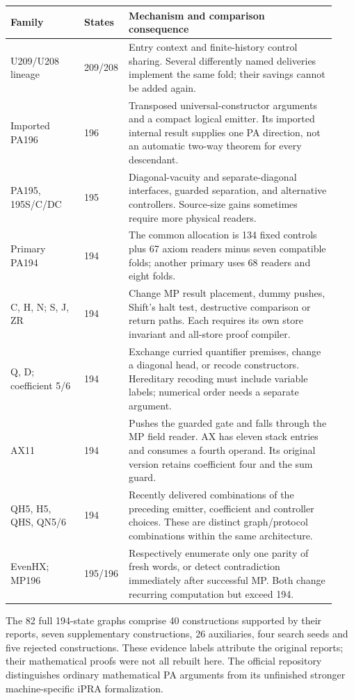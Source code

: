 \begin{longtable}{@{}p{0.22\linewidth}p{0.09\linewidth}p{0.62\linewidth}@{}}
\toprule Family & States & Mechanism and comparison consequence\\\midrule\endhead
U209/U208 lineage &209/208& Entry context and finite-history control sharing. Several differently named deliveries implement the same fold; their savings cannot be added again.\\[4pt]
Imported PA196 &196& Transposed universal-constructor arguments and a compact logical emitter. Its imported internal result supplies one PA direction, not an automatic two-way theorem for every descendant.\\[4pt]
PA195, 195S/C/DC &195& Diagonal-vacuity and separate-diagonal interfaces, guarded separation, and alternative controllers. Source-size gains sometimes require more physical readers.\\[4pt]
Primary PA194 &194& The common allocation is 134 fixed controls plus 67 axiom readers minus seven compatible folds; another primary uses 68 readers and eight folds.\\[4pt]
C, H, N; S, J, ZR &194& Change MP result placement, dummy pushes, Shift's halt test, destructive comparison or return paths. Each requires its own store invariant and all-store proof compiler.\\[4pt]
Q, D; coefficient 5/6 &194& Exchange curried quantifier premises, change a diagonal head, or recode constructors. Hereditary recoding must include variable labels; numerical order needs a separate argument.\\[4pt]
AX11 &194& Pushes the guarded gate and falls through the MP field reader. AX has eleven stack entries and consumes a fourth operand. Its original version retains coefficient four and the sum guard.\\[4pt]
QH5, H5, QHS, QN5/6 &194& Recently delivered combinations of the preceding emitter, coefficient and controller choices. These are distinct graph/protocol combinations within the same architecture.\\[4pt]
EvenHX; MP196 &195/196& Respectively enumerate only one parity of fresh words, or detect contradiction immediately after successful MP. Both change recurring computation but exceed 194.\\
\bottomrule
\end{longtable}

The 82 full 194-state graphs comprise 40 constructions supported by their
reports, seven supplementary constructions, 26 auxiliaries, four search
seeds and five rejected constructions. These evidence labels attribute the
original reports; their mathematical proofs were not all rebuilt here.
The official repository distinguishes ordinary mathematical PA arguments
from its unfinished stronger machine-specific iPRA formalization.

